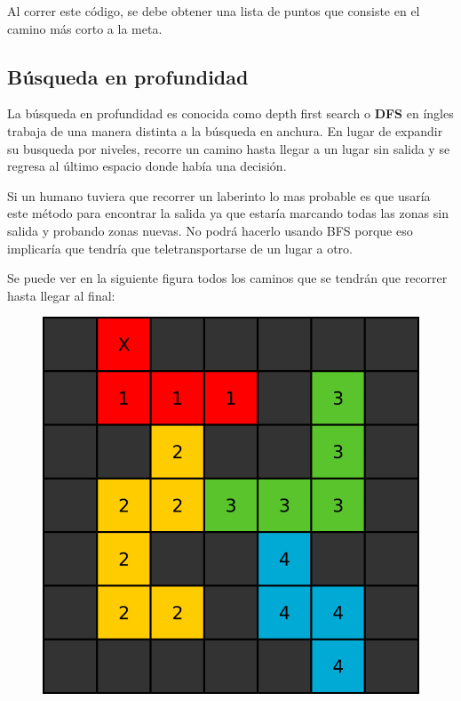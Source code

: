 \documentclass{article}
\begin{document}
Al correr este código, se debe obtener una lista de puntos que consiste en el camino más corto a la meta.

\subsection{Búsqueda en profundidad}

La búsqueda en profundidad es conocida como depth first search o \textbf{DFS} en íngles trabaja de una manera distinta a la búsqueda en anchura. En lugar de expandir su busqueda por niveles, recorre un camino hasta llegar a un lugar sin salida y se regresa al último espacio donde había una decisión.

Si un humano tuviera que recorrer un laberinto lo mas probable es que usaría este método para encontrar la salida ya que estaría marcando todas las zonas sin salida y probando zonas nuevas. No podrá hacerlo usando BFS porque eso implicaría que tendría que teletransportarse de un lugar a otro.

Se puede ver en la siguiente figura todos los caminos que se tendrán que recorrer hasta llegar al final:

\begin{figure}[H]
    \centering
    \includegraphics[width=0.3\paperwidth]{dfs}
\end{figure}
\end{document}
